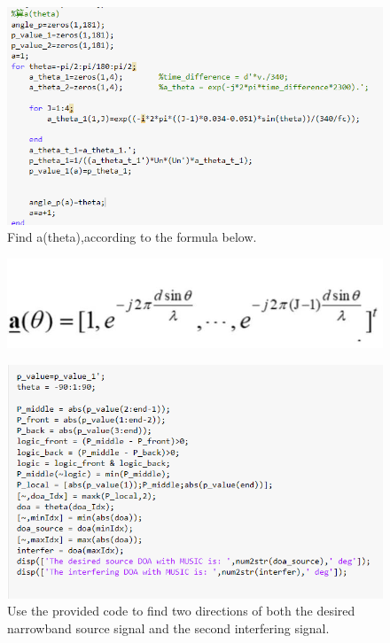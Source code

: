 \documentclass{report}
\begin{document}
\begin{figure}
\includegraphics[scale=0.7]{code a(theta)}
\\Find a(theta),according to the formula below.
\end{figure}
\begin{figure}
\includegraphics[scale=0.3]{formula1}
\end{figure}



\begin{figure}
\includegraphics[scale=0.7]{code find direction}
\\Use the provided code to find two directions of both the desired narrowband source signal and the second interfering signal.
\end{figure}
\end{document}
